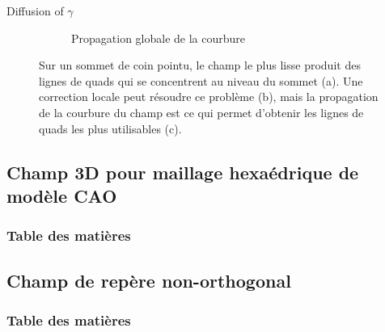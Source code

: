 \documentclass{beamer}
\begin{document}
\begin{frame}{Diffusion of $\gamma$}
\begin{figure}
\begin{subfigure}{.3\textwidth}
      \caption{Propagation globale de la courbure}
    \end{subfigure}%
    \caption{Sur un sommet de coin pointu, le champ le plus lisse produit des lignes de quads qui se concentrent au niveau du sommet (a). Une correction locale peut 
    résoudre ce problème (b), mais la propagation de la courbure du champ est ce qui permet d'obtenir les lignes de quads les plus utilisables (c).}
    \label{fig:cadff:sharp2}
    \end{figure}
    
\end{frame}
    
\subsection{Champ 3D pour maillage hexaédrique de modèle CAO}
\begin{frame}
    \frametitle{Table des matières}
    \tableofcontents[currentsubsection, sectionstyle=show/shaded, subsectionstyle=show/shaded/hide]
\end{frame}
\subsection{Champ de repère non-orthogonal}
\begin{frame}
    \frametitle{Table des matières}
    \tableofcontents[currentsubsection, sectionstyle=show/shaded, subsectionstyle=show/shaded/hide]
\end{frame}
\end{document}
